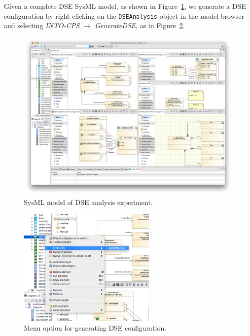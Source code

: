 Given a complete DSE SysML model, as shown in Figure~\ref{fig:dse:edit:sysml}, we generate a DSE configuration by right-clicking on the \texttt{DSEAnalysis} object in the model browser and selecting \textit{INTO-CPS} $\rightarrow$ \textit{GenerateDSE}, as in Figure~\ref{fig:dse:edit:sysml-generate-menu}.
%
%
%
\begin{figure}[ht]
	\centering
	\includegraphics[width=\textwidth]{figures/dse/sysml-model}
	\caption{SysML model of DSE analysis experiment.}\label{fig:dse:edit:sysml}
\end{figure}
%
%
%
\begin{figure}[ht]
	\centering
	\includegraphics[width=0.6\textwidth]{figures/dse/sysml-generate-menu}
	\caption{Menu option for generating DSE configuration.}\label{fig:dse:edit:sysml-generate-menu}
\end{figure}
%
%
%

